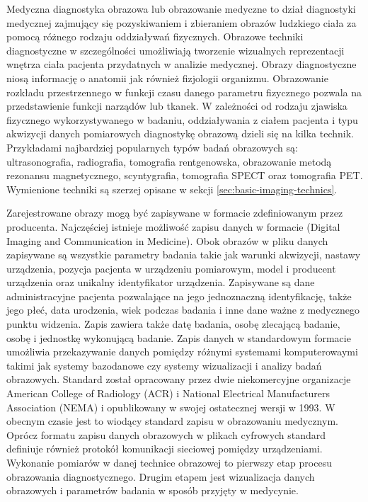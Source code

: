Medyczna diagnostyka obrazowa lub obrazowanie medyczne to dział diagnostyki medycznej zajmujący się pozyskiwaniem i zbieraniem obrazów ludzkiego ciała za pomocą różnego rodzaju oddziaływań fizycznych.
Obrazowe techniki diagnostyczne w szczególności umożliwiają tworzenie wizualnych reprezentacji wnętrza ciała pacjenta przydatnych w analizie medycznej. Obrazy diagnostyczne niosą informację o anatomii jak również fizjologii organizmu.
Obrazowanie rozkładu przestrzennego w funkcji czasu danego parametru fizycznego pozwala na przedstawienie funkcji narządów lub tkanek.
W zależności od rodzaju zjawiska fizycznego wykorzystywanego w badaniu, oddziaływania z ciałem pacjenta i typu akwizycji danych pomiarowych diagnostykę obrazową dzieli się na kilka technik.
Przykładami najbardziej popularnych typów badań obrazowych są: ultrasonografia, radiografia, tomografia rentgenowska, obrazowanie metodą rezonansu magnetycznego, scyntygrafia, tomografia SPECT oraz tomografia PET.
Wymienione techniki są szerzej opisane w sekcji \ref{sec:basic-imaging-technics}.
\par
Zarejestrowane obrazy mogą być zapisywane w formacie zdefiniowanym przez producenta.
Najczęściej istnieje możliwość zapisu danych w formacie \DICOM (Digital Imaging and Communication in Medicine). 
Obok obrazów w pliku danych zapisywane są wszystkie parametry badania takie jak warunki akwizycji, nastawy urządzenia, pozycja pacjenta w urządzeniu pomiarowym, model i producent urządzenia oraz unikalny identyfikator urządzenia.
Zapisywane są dane administracyjne pacjenta pozwalające na jego jednoznaczną identyfikację, także jego płeć, data urodzenia, wiek podczas badania i inne dane ważne z medycznego punktu widzenia.
Zapis zawiera także datę badania, osobę zlecającą badanie, osobę i jednostkę wykonującą badanie.
Zapis danych w standardowym formacie \DICOM umożliwia przekazywanie danych pomiędzy różnymi systemami komputerowaymi takimi jak systemy bazodanowe czy systemy wizualizacji i analizy badań obrazowych.
Standard \DICOM został opracowany przez dwie niekomercyjne organizacje American College of Radiology (ACR) i National Electrical Manufacturers Association (NEMA) i opublikowany w swojej ostatecznej wersji w 1993.
W obecnym czasie jest to wiodący standard zapisu w obrazowaniu medycznym.
Oprócz formatu zapisu danych obrazowych w plikach cyfrowych standard \DICOM definiuje również protokół komunikacji sieciowej pomiędzy urządzeniami.
Wykonanie pomiarów w danej technice obrazowej to pierwszy etap procesu obrazowania diagnostycznego. Drugim etapem jest wizualizacja danych obrazowych i parametrów badania w sposób przyjęty w medycynie.
